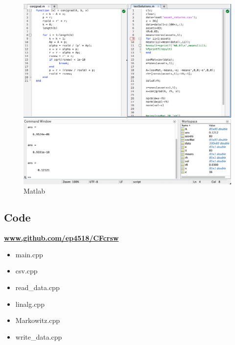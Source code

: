 \documentclass[12pt,twoside]{article}
\begin{document}
\begin{figure}[htbp!]
    \centering
    \includegraphics[width = 1.0\hsize]{./figures/ss.png}
    \caption{Matlab}
\label{fig:Matlab}
\end{figure}

\newpage
\subsection{Code}
\textbf{\href{https://github.com/ep4518/CFcrsw}{www.github.com/ep4518/CFcrsw}}
\begin{itemize}
    \item main.cpp
    \item csv.cpp
    \item read\_data.cpp
    \item linalg.cpp
    \item Markowitz.cpp
    \item write\_data.cpp
\end{itemize}
\end{document}
